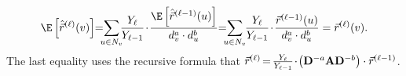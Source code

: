 \begin{equation}\nonumber
\begin{aligned}
\E \left[ \hat{\vec{r}}^{(\ell)}(v) \right]\hspace{-1mm}=\hspace{-2mm}\sum_{u \in N_v}\hspace{-1.5mm} \frac{Y_{\ell}}{Y_{\ell-1}} \hspace{-0.5mm} \cdot \hspace{-0.5mm} \frac{\E \left[\hat{\vec{r}}^{(\ell-1)}(u)\right]}{d_v^a\cdot d_u^b}\hspace{-1mm}=\hspace{-2mm}\sum_{u \in N_v}\hspace{-1mm} \frac{Y_{\ell}}{Y_{\ell-1}}\hspace{-0.5mm} \cdot \hspace{-0.5mm}\frac{\vec{r}^{(\ell-1)}(u)}{d_v^a\cdot d_u^b}=\vec{r}^{(\ell)}(v). 
\end{aligned}
\end{equation} 
The last equality uses the recursive formula that $\vec{r}^{(\ell)}\hspace{-0.5mm} =\hspace{-0.5mm} \frac{Y_{\ell}}{Y_{\ell-1}}\hspace{-0.5mm} \cdot \hspace{-0.5mm}\left(\mathbf{D}^{-a}\mathbf{A}\mathbf{D}^{-b} \right) \cdot \vec{r}^{(\ell-1)}$. 
	

